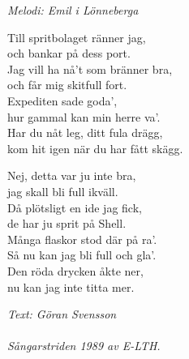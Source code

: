 {\footnotesize\textit{Melodi: Emil i Lönneberga}}\par
\vspace{10pt}
Till spritbolaget ränner jag,\\
och bankar på dess port.\\
Jag vill ha nå't som bränner bra,\\
och får mig skitfull fort.\\
Expediten sade goda',\\
hur gammal kan min herre va'.\\
Har du nåt leg, ditt fula drägg,\\
kom hit igen när du har fått skägg.\par
\vspace{10pt}
Nej, detta var ju inte bra,\\
jag skall bli full ikväll.\\
Då plötsligt en ide jag fick,\\
de har ju sprit på Shell.\\
Många flaskor stod där på ra'.\\
Så nu kan jag bli full och gla'.\\
Den röda drycken åkte ner,\\
nu kan jag inte titta mer.\par
\vspace{10pt}
{\footnotesize\textit{Text: Göran Svensson \\ \\ Sångarstriden 1989 av
    E-LTH.}}
